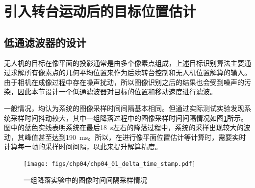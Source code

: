 \section{引入转台运动后的目标位置估计}
\subsection{低通滤波器的设计}
无人机的目标在像平面的投影通常是由多个像素点组成，上述目标识别算法主要通过求解所有像素点的几何平均位置来作为后续转台控制和无人机位置解算的输入。由于相机在成像过程中存在噪声扰动，所以图像识别之后的结果也会受到噪声的污染，因此本节设计一个低通滤波器对目标的位置和移动速度进行滤波。

一般情况，均认为系统的图像采样时间间隔基本相同。但通过实际测试实验发现系统采样时间抖动较大，其中一组降落过程中的图像采样时间间隔情况如图\ref{fig:chp04_01_delta_time_stamp}所示。图中的蓝色实线表明系统在最后18\ s左右的降落过程中，系统的采样出现较大的波动，其峰值甚至达到190\ ms。所以，在进行像平面位置估计等计算时，需要实时计算每一帧的采样时间间隔，以此来提升解算精度。

\begin{figure}[htb]   
	\centering
	\texttt{[image: figs/chp04/chp04\_01\_delta\_time\_stamp.pdf]}
	\caption{一组降落实验中的图像时间间隔采样情况}
	\label{fig:chp04_01_delta_time_stamp}
\end{figure}

